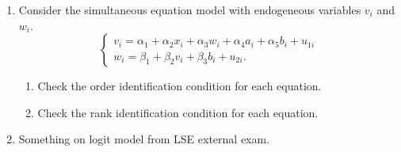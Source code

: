 \documentclass[12pt]{article}
\begin{document}
\begin{enumerate}
    \item Consider the simultaneous equation model with endogeneous variables $v_i$ and $w_i$.
    \[
    \begin{cases}
        v_i = \alpha_1 + \alpha_2 x_i + \alpha_3 w_i + \alpha_4 a_i + \alpha_5 b_i + u_{1i} \\
        w_i = \beta_1 + \beta_2 v_i + \beta_3 b_i + u_{2i}.
    \end{cases}
    \]

    \begin{enumerate}
        \item Check the order identification condition for each equation. 
        \item Check the rank identification condition for each equation. 
    \end{enumerate}

    \item Something on logit model from LSE external exam. 
\end{enumerate}
\end{document}
